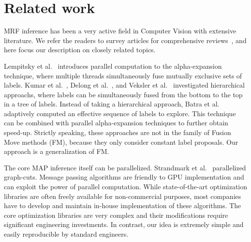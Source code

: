 \section{Related work}


MRF inference has been a very active field in Computer Vision with
extensive literature. We refer the readers to survey articles for
comprehensive
reviews~\cite{middlebury_mrf,comparative_study_of_modern_inference}, and
here focus our description on closely related topics.


\noindent Lempitsky et
al.~\cite{fusion_moves_for_markov_random_field_optimization}
introduces parallel computation to the alpha-expansion technique,
where multiple threads simultaneously fuse mutually exclusive sets of
labels. Kumar et al.~\cite{hierarchical_graph_cuts_kumar_and_koller},
Delong et al.~\cite{delong_hierarchical_fusion}, and Veksler et
al.~\cite{olga_hierarchical_alpha_expansion} investigated hierarchical
approachs, where labels can be simultaneously fused from the bottom to
the top in a tree of labels.
% 
Instead of taking a hierarchical approach, Batra et
al.~\cite{Dhruv_pushmeet_making_the_right_move} adaptively computed an
effective sequence of labels to explore. This technique can be combined
with parallel alpha-expansion techniques to further obtain speed-up.
%
Strictly speaking, these approaches are not in the family of Fusion Move
methods (FM), because they only consider constant label proposals. Our
approach is a generalization of FM.



\noindent The core MAP inference itself can be parallelized.  Strandmark
et al.~\cite{strandmark_parallel} parallelized graph-cuts.
%
Message passing algorithms are friendly to GPU implementation and can
exploit the power of parallel computation.
%
%
While state-of-the-art optimization libraries are often freely available
for non-commercial purposes, most companies have to develop and maintain
in-house implementation of these algorithms.  The core optimization
libraries are very complex and their modifications require significant
engineering investments. In contrast, our idea is extremely simple and
easily reproducible by standard engineers.





